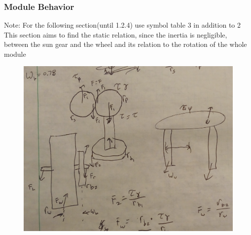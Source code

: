 \documentclass{article}
\begin{document}
\subsubsection{Module Behavior}
{\footnotesize Note: For the following section(until 1.2.4) use symbol table 3 in addition to 2}\\
This section aims to find the static relation, since the inertia is negligible, between the sun gear and the wheel and its relation to the rotation of the whole module
\begin{center}




    \begin{figure}[h]
        \includegraphics[width=\textwidth]{module_diagram.jpg}
    \end{figure}
    \begin{tikzpicture} [axis/.style={blue, very thick},
            vector/.style={black,thick},
            vector guide/.style={dashed,black}]


\end{tikzpicture}
\end{center}
\end{document}
